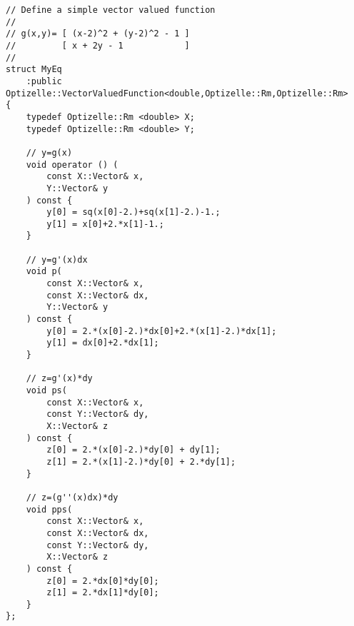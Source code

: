 \begin{lstlisting}[style=C++]
// Define a simple vector valued function 
//
// g(x,y)= [ (x-2)^2 + (y-2)^2 - 1 ] 
//         [ x + 2y - 1            ] 
//
struct MyEq
    :public Optizelle::VectorValuedFunction<double,Optizelle::Rm,Optizelle::Rm>
{
    typedef Optizelle::Rm <double> X;
    typedef Optizelle::Rm <double> Y;

    // y=g(x) 
    void operator () (
        const X::Vector& x,
        Y::Vector& y
    ) const {
        y[0] = sq(x[0]-2.)+sq(x[1]-2.)-1.;
        y[1] = x[0]+2.*x[1]-1.;
    }

    // y=g'(x)dx
    void p(
        const X::Vector& x,
        const X::Vector& dx,
        Y::Vector& y
    ) const {
        y[0] = 2.*(x[0]-2.)*dx[0]+2.*(x[1]-2.)*dx[1];
        y[1] = dx[0]+2.*dx[1];
    }

    // z=g'(x)*dy
    void ps(
        const X::Vector& x,
        const Y::Vector& dy,
        X::Vector& z
    ) const {
        z[0] = 2.*(x[0]-2.)*dy[0] + dy[1];
        z[1] = 2.*(x[1]-2.)*dy[0] + 2.*dy[1];
    }

    // z=(g''(x)dx)*dy
    void pps(
        const X::Vector& x,
        const X::Vector& dx,
        const Y::Vector& dy,
        X::Vector& z
    ) const {
        z[0] = 2.*dx[0]*dy[0];
        z[1] = 2.*dx[1]*dy[0];
    }
};
\end{lstlisting}
